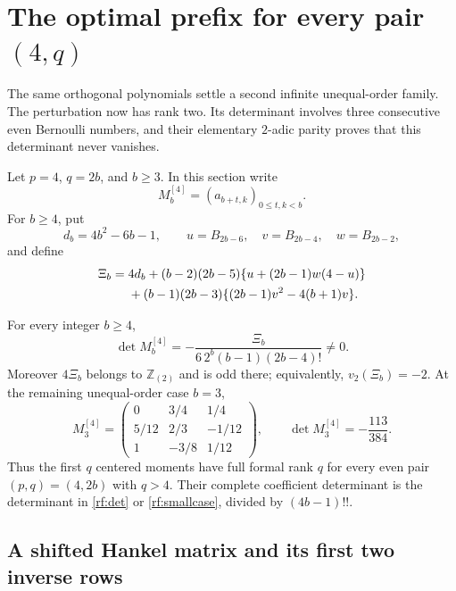 
\section{The optimal prefix for every pair \texorpdfstring{$(4,q)$}{(4,q)}}
\label{rf:section}

The same orthogonal polynomials settle a second infinite unequal-order
family.  The perturbation now has rank two.  Its determinant involves
three consecutive even Bernoulli numbers, and their elementary
$2$-adic parity proves that this determinant never vanishes.

Let $p=4$, $q=2b$, and $b\geq3$.  In this section write
\[
 M_b^{[4]}=(a_{b+t,k})_{0\leq t,k<b}.
\]
For $b\geq4$, put
\[
 d_b=4b^2-6b-1,\qquad
 u=B_{2b-6},\quad v=B_{2b-4},\quad w=B_{2b-2},
\]
and define
\begin{align}
 \Xi_b={}&4d_b
 +(b-2)(2b-5)\{u+(2b-1)w(4-u)\}\notag\\
 &+(b-1)(2b-3)\{(2b-1)v^2-4(b+1)v\}.
 \label{rf:Xi}
\end{align}

\begin{theorem}
\label{rf:main}
For every integer $b\geq4$,
\begin{equation}\label{rf:det}
 \boxed{\displaystyle
 \det M_b^{[4]}=-\frac{\Xi_b}
      {6\,2^b(b-1)(2b-4)!}\ne0.}
\end{equation}
Moreover $4\Xi_b$ belongs to $\mathbb Z_{(2)}$ and is odd there;
equivalently, $v_2(\Xi_b)=-2$.  At the remaining unequal-order
case $b=3$,
\begin{equation}\label{rf:smallcase}
 M_3^{[4]}=
 \begin{pmatrix}
 0&3/4&1/4\\5/12&2/3&-1/12\\1&-3/8&1/12
 \end{pmatrix},\qquad
 \det M_3^{[4]}=-\frac{113}{384}.
\end{equation}
Thus the first $q$ centered moments have full formal rank $q$
for every even pair $(p,q)=(4,2b)$ with $q>4$.  Their complete
coefficient determinant is the determinant in
\eqref{rf:det} or \eqref{rf:smallcase}, divided by $(4b-1)!!$.
\end{theorem}

\subsection{A shifted Hankel matrix and its first two inverse rows}

